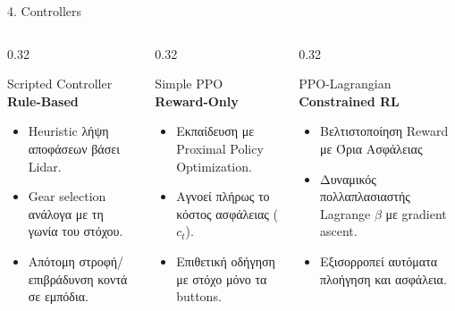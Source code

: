 \documentclass[10pt]{beamer}
\begin{document}
\begin{frame}{4. Controllers}
    \begin{columns}[t]
        \begin{column}{0.32\textwidth}
            \begin{block}{Scripted Controller}
                \small
                \textbf{Rule-Based}
                \begin{itemize}
                    \item Heuristic λήψη αποφάσεων βάσει Lidar.
                    \item Gear selection ανάλογα με τη γωνία του στόχου.
                    \item Απότομη στροφή/επιβράδυνση κοντά σε εμπόδια.
                    \newline
                \end{itemize}
            \end{block}
        \end{column}
        
        \begin{column}{0.32\textwidth}
            \begin{block}{Simple PPO}
                \small
                \textbf{Reward-Only}
                \begin{itemize}
                    \item Εκπαίδευση με Proximal Policy Optimization.
                    \item Αγνοεί πλήρως το κόστος ασφάλειας ($c_t$).
                    \item Επιθετική οδήγηση με στόχο μόνο τα buttons.
                    \newline
                    \newline
                \end{itemize}
            \end{block}
        \end{column}
        
        \begin{column}{0.32\textwidth}
            \begin{block}{PPO-Lagrangian}
                \small
                \textbf{Constrained RL}
                \begin{itemize}
                    \item Βελτιστοποίηση Reward με Όρια Ασφάλειας
                    \item Δυναμικός πολλαπλασιαστής Lagrange $\beta$ με gradient ascent.
                    \item Εξισορροπεί αυτόματα πλοήγηση και ασφάλεια.
                \end{itemize}
            \end{block}
        \end{column}
    \end{columns}
\end{frame}
\end{document}
